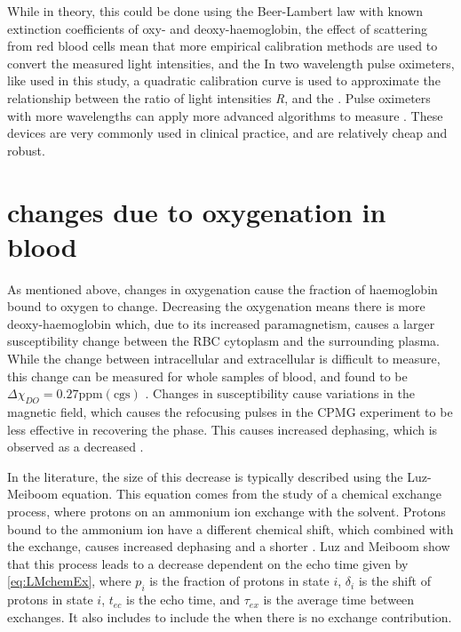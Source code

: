 While in theory, this could be done using the Beer-Lambert law with known extinction coefficients of oxy- and deoxy-haemoglobin, the effect of scattering  from red blood cells mean that more empirical calibration methods are used to convert the measured light intensities, and the \SOtwo \cite{WiebenLightAbsorbancePulse1997}
In two wavelength pulse oximeters, like used in this study, a quadratic calibration curve is used to approximate the relationship between the ratio of light intensities \textit{R}, and the \SOtwo.
Pulse oximeters with more wavelengths can apply more advanced algorithms to measure \SOtwo.
These devices are very commonly used in clinical practice, and are relatively cheap and robust.

\section{\Ttwo changes due to oxygenation in blood}
\label{sec:back-T2SO2}
As mentioned above, changes in oxygenation cause the fraction of haemoglobin bound to oxygen to change.
Decreasing the oxygenation means there is more deoxy-haemoglobin which, due to its increased paramagnetism, causes a larger susceptibility change between the RBC cytoplasm and the surrounding plasma.
While the change between intracellular and extracellular is difficult to measure, this change can be measured for whole samples of blood, and found to be $\Delta\chi_{DO} = 0.27 \mathrm{ppm  (cgs)}$ \cite{JainInvestigatingmagneticsusceptibility2012}.
Changes in susceptibility cause variations in the magnetic field, which causes the refocusing pulses in the CPMG experiment to be less effective in recovering the phase.
This causes increased dephasing, which is observed as a decreased \Ttwo.

In the literature, the size of this decrease is typically described using the Luz-Meiboom equation.
This equation comes from the study of a chemical exchange process, where protons on an ammonium ion exchange with the solvent\cite{LuzNuclearMagneticResonance1963}.
Protons bound to the ammonium ion have a different chemical shift, which combined with the exchange, causes increased dephasing and a shorter \Ttwo.
Luz and Meiboom show that this process leads to a \Ttwo decrease dependent on the echo time given by \autoref{eq:LMchemEx}\cite{LuzNuclearMagneticResonance1963}, where $p_i$ is the fraction of protons in state $i$, $\delta_i$ is the shift of protons in state $i$, $t_{ec}$ is the echo time, and $\tau_{ex}$ is the average time between exchanges. It also includes \TtwoO to include the \Ttwo when there is no exchange contribution.

